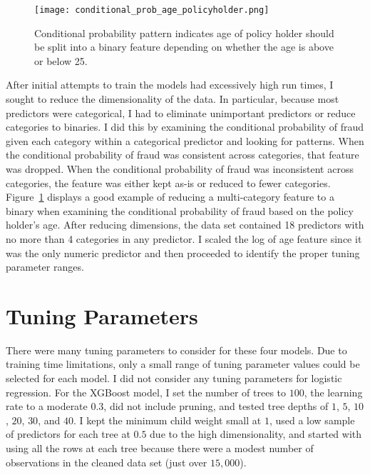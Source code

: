 \documentclass{article}
\begin{document}
\begin{figure}
    \centering
    \texttt{[image: conditional\_prob\_age\_policyholder.png]}
    \caption{Conditional probability pattern indicates age of policy holder should be split into a 
    binary feature depending on whether the age is above or below 25.}
    \label{fig:age_policyholder}
\end{figure}

After initial attempts to train the models had excessively high run times, I sought to reduce the 
dimensionality of the data.  In particular, because most predictors were categorical, I had to 
eliminate unimportant predictors or reduce categories to binaries.  I did this by examining the 
conditional probability of fraud given each category within a categorical predictor and looking 
for patterns.  When the conditional probability of fraud was consistent across categories, that 
feature was dropped.  When the conditional probability of fraud was inconsistent across categories, 
the feature was either kept as-is or reduced to fewer categories.   Figure~\ref{fig:age_policyholder} 
displays a good example of reducing a multi-category feature to a binary when examining the 
conditional probability of fraud based on the policy holder's age. After reducing dimensions, the 
data set contained 18 predictors with no more than 4 categories in any predictor.  I scaled the log 
of age feature since it was the only numeric predictor and then proceeded to identify the proper 
tuning parameter ranges.

\section{Tuning Parameters}

There were many tuning parameters to consider for these four models.  Due to training time limitations, 
only a small range of tuning parameter values could be selected for each model.  I did not consider 
any tuning parameters for logistic regression.  For the XGBoost model, I set the number of trees to 
$100$, the learning rate to a moderate $0.3$, did not include pruning, and tested tree depths of $1$, 
$5$, $10$, $20$, $30$, and $40$.  I kept the minimum child weight small at $1$, used a low sample of 
predictors for each tree at $0.5$ due to the high dimensionality, and started with using all the rows 
at each tree because there were a modest number of observations in the cleaned data set (just over 
$15,000$).  
\end{document}
